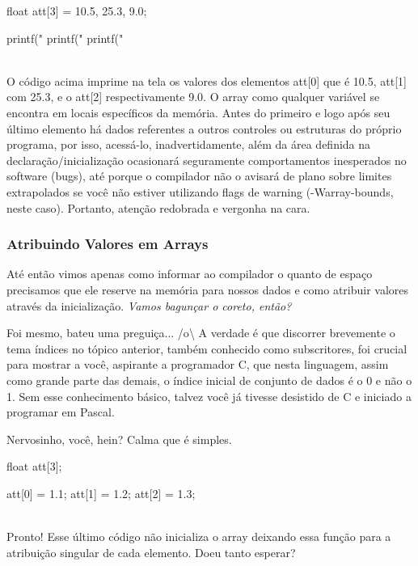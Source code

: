\begin{ccode}
  float att[3] = {10.5, 25.3, 9.0};

  printf("%
  printf("%
  printf("%
\end{ccode}
\\

O código acima imprime na tela os valores dos elementos att[0] que é 10.5, att[1] com 25.3, e o att[2] respectivamente 9.0. O array como qualquer variável se encontra em locais específicos da memória. Antes do primeiro e logo após seu último elemento há dados referentes a outros controles ou estruturas do próprio programa, por isso, acessá-lo, inadvertidamente, além da área definida na declaração/inicialização ocasionará seguramente comportamentos inesperados no software (bugs), até porque o compilador não o avisará de plano sobre limites extrapolados se você não estiver utilizando flags de warning (-Warray-bounds, neste caso). Portanto, atenção redobrada e vergonha na cara.

\subsubsection{Atribuindo Valores em Arrays}
Até então vimos apenas como informar ao compilador o quanto de espaço precisamos que ele reserve na memória para nossos dados e como atribuir valores através da inicialização. \textit{Vamos bagunçar o coreto, então?}


Foi mesmo, bateu uma preguiça... /o{\textbackslash} A verdade é que discorrer brevemente o tema índices no tópico anterior, também conhecido como subscritores, foi crucial para mostrar a você, aspirante a programador C, que nesta linguagem, assim como grande parte das demais, o índice inicial de conjunto de dados é o 0 e não o 1. Sem esse conhecimento básico, talvez você já tivesse desistido de C e iniciado a programar em Pascal.


Nervosinho, você, hein? Calma que é simples.

\begin{ccode}
  float att[3];

  att[0] = 1.1;
  att[1] = 1.2;
  att[2] = 1.3;
\end{ccode}
\\

Pronto! Esse último código não inicializa o array deixando essa função para a atribuição singular de cada elemento. Doeu tanto esperar?

